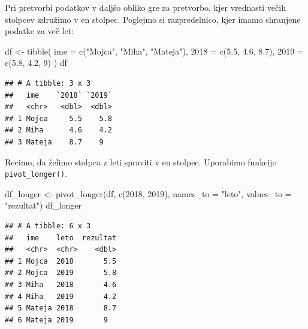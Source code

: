 \documentclass[
]{book}
\newenvironment{Shaded}{\begin{snugshade}}{\end{snugshade}}
\newcommand{\AttributeTok}[1]{\textcolor[rgb]{0.77,0.63,0.00}{#1}}
\newcommand{\DecValTok}[1]{\textcolor[rgb]{0.00,0.00,0.81}{#1}}
\newcommand{\FloatTok}[1]{\textcolor[rgb]{0.00,0.00,0.81}{#1}}
\newcommand{\FunctionTok}[1]{\textcolor[rgb]{0.00,0.00,0.00}{#1}}
\newcommand{\NormalTok}[1]{#1}
\newcommand{\OtherTok}[1]{\textcolor[rgb]{0.56,0.35,0.01}{#1}}
\newcommand{\StringTok}[1]{\textcolor[rgb]{0.31,0.60,0.02}{#1}}
\begin{document}
Pri pretvorbi podatkov v daljšo obliko gre za pretvorbo, kjer vrednosti večih stolpcev združimo v en stolpec. Poglejmo si razpredelnico, kjer imamo shranjene podatke za več let:

\begin{Shaded}
\begin{Highlighting}[]
\NormalTok{df }\OtherTok{\textless{}{-}} \FunctionTok{tibble}\NormalTok{(}
  \AttributeTok{ime =} \FunctionTok{c}\NormalTok{(}\StringTok{"Mojca"}\NormalTok{, }\StringTok{"Miha"}\NormalTok{, }\StringTok{"Mateja"}\NormalTok{),}
  \StringTok{\textasciigrave{}}\AttributeTok{2018}\StringTok{\textasciigrave{}} \OtherTok{=} \FunctionTok{c}\NormalTok{(}\FloatTok{5.5}\NormalTok{, }\FloatTok{4.6}\NormalTok{, }\FloatTok{8.7}\NormalTok{),}
  \StringTok{\textasciigrave{}}\AttributeTok{2019}\StringTok{\textasciigrave{}} \OtherTok{=} \FunctionTok{c}\NormalTok{(}\FloatTok{5.8}\NormalTok{, }\FloatTok{4.2}\NormalTok{, }\DecValTok{9}\NormalTok{)}
\NormalTok{)}
\NormalTok{df}
\end{Highlighting}
\end{Shaded}

\begin{verbatim}
## # A tibble: 3 x 3
##   ime    `2018` `2019`
##   <chr>   <dbl>  <dbl>
## 1 Mojca     5.5    5.8
## 2 Miha      4.6    4.2
## 3 Mateja    8.7    9
\end{verbatim}

Recimo, da želimo stolpca z leti spraviti v en stolpec. Uporabimo funkcijo \texttt{pivot\_longer()}.

\begin{Shaded}
\begin{Highlighting}[]
\NormalTok{df\_longer }\OtherTok{\textless{}{-}} \FunctionTok{pivot\_longer}\NormalTok{(df, }\FunctionTok{c}\NormalTok{(}\StringTok{\textasciigrave{}}\AttributeTok{2018}\StringTok{\textasciigrave{}}\NormalTok{, }\StringTok{\textasciigrave{}}\AttributeTok{2019}\StringTok{\textasciigrave{}}\NormalTok{), }\AttributeTok{names\_to =} \StringTok{"leto"}\NormalTok{, }\AttributeTok{values\_to =} \StringTok{"rezultat"}\NormalTok{)}
\NormalTok{df\_longer}
\end{Highlighting}
\end{Shaded}

\begin{verbatim}
## # A tibble: 6 x 3
##   ime    leto  rezultat
##   <chr>  <chr>    <dbl>
## 1 Mojca  2018       5.5
## 2 Mojca  2019       5.8
## 3 Miha   2018       4.6
## 4 Miha   2019       4.2
## 5 Mateja 2018       8.7
## 6 Mateja 2019       9
\end{verbatim}
\end{document}
